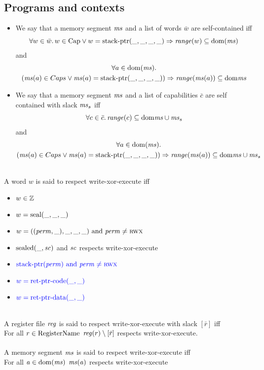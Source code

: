 \documentclass[a4paper]{article}
\begin{document}
\subsection{Programs and contexts}
\begin{definition}
  \label{def:self-contained}
  \begin{itemize}
  \item We say that a memory segment $\mathit{ms}$ and a list of words $\bar{w}$
    are self-contained iff
  \[
    \forall w \in \bar{w} \ldotp w \in \Caps \lor w = \stkptr{\_,\_,\_,\_} \Rightarrow \range{w} \subseteq \dom(\ms)
  \]
  and
  \begin{multline*}
    \forall a \in \dom(\ms) \ldotp\\
    (\ms(a) \in Caps \lor \ms(a) = \stkptr{\_,\_,\_,\_}) \Rightarrow \range{\ms(a)} \subseteq \dom{\ms}
  \end{multline*}
  \item We say that a memory segment $\mathit{ms}$ and a list of capabilities $\bar{c}$ are self contained with slack $\mathit{ms}_s$ iff
  \[
    \forall c \in \bar{c} \ldotp \range{c} \subseteq \dom{\ms \cup \ms_s}
  \]
  and
  \begin{multline*}
    \forall a \in \dom(\ms) \ldotp\\
    (\ms(a) \in Caps \lor \ms(a) = \stkptr{\_,\_,\_,\_}) \Rightarrow \range{\ms(a)} \subseteq \dom{\ms \cup \ms_s}
  \end{multline*}
\end{itemize}
\end{definition}

\begin{definition}
  \label{def:wxorx}
  ~\\
  A word $w$ is said to respect write-xor-execute iff
  \begin{itemize}
  \item $w \in \mathbb{Z}$
  \item $w = \mathrm{seal}(\_,\_,\_)$
  \item $w = ((\mathit{perm},\_),\_,\_,\_) \text{ and } \mathit{perm} \neq \textsc{rwx}$
  \item $\mathrm{sealed}(\_,\mathit{sc})$ and $\mathit{sc}$ respects write-xor-execute
  \item ${\color{blue} \mathrm{stack\text{-}ptr}(\mathit{perm}) \text{ and } \mathit{perm} \neq \textsc{rwx}}$
  \item ${\color{blue} w = \mathrm{ret\text{-}ptr\text{-}code}(\_,\_)}$
  \item ${\color{blue} w = \mathrm{ret\text{-}ptr\text{-}data}(\_,\_)}$
  \end{itemize}
~\\
  A register file $\mathit{reg}$ is said to respect write-xor-execute with slack $[\bar{r}]$ iff \\
  For all $r \in \mathrm{RegisterName}$ $\mathit{reg}(r) \setminus [\bar{r}]$ respects write-xor-execute.
~\\
~\\
  A memory segment $\mathit{ms}$ is said to respect write-xor-execute iff\\
  For all $\mathit{a} \in \mathrm{dom}(\mathit{ms})$ $\mathit{ms}(\mathit{a})$ respects write-xor-execute
\end{definition}
\end{document}
